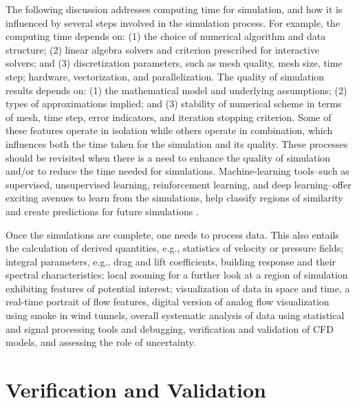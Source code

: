 The following discussion addresses computing time for simulation, and how it is influenced by several steps involved in the simulation process. For example, the computing time depends on: (1) the choice of numerical algorithm and data structure; (2) linear algebra solvers and criterion prescribed for interactive solvers; and (3) discretization parameters, such as mesh quality, mesh size, time step; hardware, vectorization, and parallelization. The quality of simulation results depends on: (1) the mathematical model and underlying assumptions; (2) types of approximations implied; and (3) stability of numerical scheme in terms of mesh, time step, error indicators, and iteration stopping criterion. Some of these features operate in isolation while others operate in combination, which influences both the time taken for the simulation and its quality. These processes should be revisited when there is a need to enhance the quality of simulation and/or to reduce the time needed for simulations. Machine-learning tools--such as supervised, unsupervised learning, reinforcement learning, and deep learning--offer exciting avenues to learn from the simulations, help classify regions of similarity and create predictions for future simulations \citep{kareem2019generalized}.

Once the simulations are complete, one needs to process data. This also entails the calculation of derived quantities, e.g., statistics of velocity or pressure fields; integral parameters, e.g., drag and lift coefficients, building response and their spectral characteristics; local zooming for a further look at a region of simulation exhibiting features of potential interest; visualization of data in space and time, a real-time portrait of flow features, digital version of analog flow visualization using smoke in wind tunnels, overall systematic analysis of data using statistical and signal processing tools and debugging, verification and validation of CFD models, and assessing the role of uncertainty.

\section{Verification and Validation}
\label{sec:resp_cfd_wind_flow_modeling}


